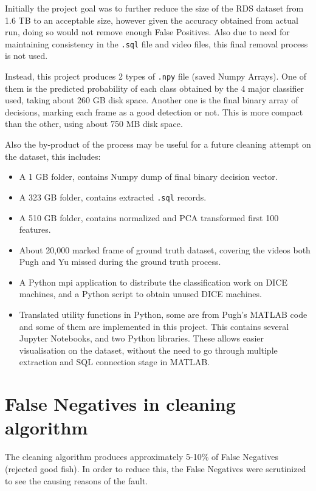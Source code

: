 \documentclass[bsc,logo,twoside,fullspacing,parskip]{infthesis}
\begin{document}
Initially the project goal was to further reduce the size of the RDS dataset from 1.6 TB to an acceptable size, however given the accuracy obtained from actual run, doing so would not remove enough False Positives. Also due to need for maintaining consistency in the {\tt .sql} file and video files, this final removal process is not used.

Instead, this project produces 2 types of {\tt .npy} file (saved Numpy Arrays). 
One of them is the predicted probability of each class obtained by the 4 major classifier used, taking about 260 GB disk space. 
Another one is the final binary array of decisions, marking each frame as a good detection or not. 
This is more compact than the other, using about 750 MB disk space.

Also the by-product of the process may be useful for a future cleaning attempt on the dataset, this includes:
\begin{itemize}
\setlength{\parskip}{3pt}
\item A 1 GB folder, contains Numpy dump of final binary decision vector.
\item A 323 GB folder, contains extracted {\tt .sql} records.
\item A 510 GB folder, contains normalized and PCA transformed first 100 features.
\item About 20,000 marked frame of ground truth dataset, covering the videos both Pugh and Yu missed during the ground truth process.
\item A Python mpi application to distribute the classification work on DICE machines, and a Python script to obtain unused DICE machines.
\item Translated utility functions in Python, some are from Pugh's MATLAB code and some of them are implemented in this project. 
This contains several Jupyter Notebooks, and two Python libraries. 
These allows easier visualisation on the dataset, without the need to go through multiple extraction and SQL connection stage in MATLAB. 
\end{itemize}

\section{False Negatives in cleaning algorithm}
\label{sec:falsenegative}
\label{sec:feiffault}
\label{sec:svmfault}

The cleaning algorithm produces approximately 5-10\% of False Negatives (rejected good fish). 
In order to reduce this, the False Negatives were scrutinized to see the causing reasons of the fault.
\end{document}
